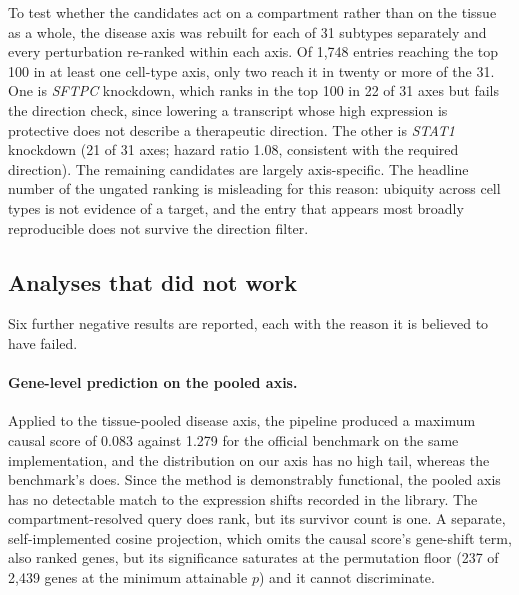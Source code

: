 To test whether the candidates act on a compartment rather than on the tissue as a whole,
the disease axis was rebuilt for each of 31 subtypes separately and every perturbation
re-ranked within each axis. Of 1,748 entries reaching the top 100 in at least one cell-type
axis, only two reach it in twenty or more of the 31. One is \emph{SFTPC} knockdown, which
ranks in the top 100 in 22 of 31 axes but fails the direction check, since lowering a
transcript whose high expression is protective does not describe a therapeutic direction.
The other is \emph{STAT1} knockdown (21 of 31 axes; hazard ratio 1.08, consistent with the
required direction). The remaining candidates are largely axis-specific. The headline number
of the ungated ranking is misleading for this reason: ubiquity across cell types is not
evidence of a target, and the entry that appears most broadly reproducible does not survive
the direction filter.

\subsection{Analyses that did not work}

Six further negative results are reported, each with the reason it is believed to have
failed.

\paragraph{Gene-level prediction on the pooled axis.} Applied to the tissue-pooled disease
axis, the pipeline produced a maximum causal score of 0.083 against 1.279 for the official
benchmark on the same implementation, and the distribution on our axis has no high tail,
whereas the benchmark's does. Since the method is demonstrably functional, the pooled axis
has no detectable match to the expression shifts recorded in the library. The
compartment-resolved query does rank, but its survivor count is one. A separate,
self-implemented cosine projection, which omits the causal score's gene-shift term, also
ranked genes, but its significance saturates at the permutation floor (237 of 2,439 genes at
the minimum attainable $p$) and it cannot discriminate.

